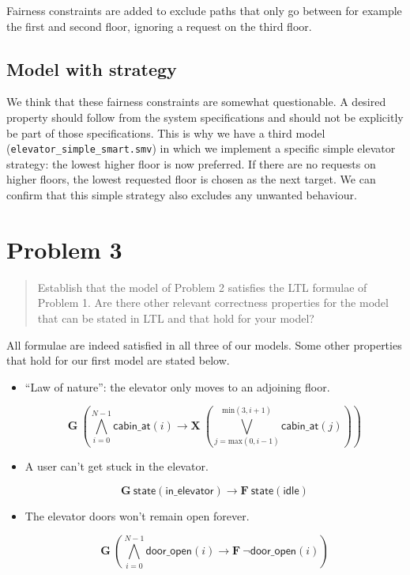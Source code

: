 \documentclass[a4paper,10pt]{article}
\newcommand{\LTLG}{\mathbf{G~}}
\newcommand{\LTLF}{\mathbf{F~}}
\newcommand{\LTLX}{\mathbf{X~}}
\newcommand{\disjall}[2]{\mathop{\bigvee}\limits_{#1}^{#2}}
\newcommand{\conjall}[2]{\mathop{\bigwedge}\limits_{#1}^{#2}}
\newcommand{\dooropen}[1]{\mathsf{door\_open}(#1)}
\newcommand{\cabinat}[1]{\mathsf{cabin\_at}(#1)}
\newcommand{\state}[1]{\mathsf{state}(\mathsf{#1})}
\newcommand{\imply}{\rightarrow}
\begin{document}
	Fairness constraints are added to exclude paths that only go between for example the first and second floor, ignoring a request on the third floor.
	
	\subsection{Model with strategy}
	We think that these fairness constraints are somewhat questionable. A desired property should follow from the system specifications and should not be explicitly be part of those specifications. This is why we have a third model (\texttt{elevator\_simple\_smart.smv}) in which we implement a specific simple elevator strategy: the lowest higher floor is now preferred. If there are no requests on higher floors, the lowest requested floor is chosen as the next target. We can confirm that this simple strategy also excludes any unwanted behaviour.
	
	\section{Problem 3}
	
	\begin{quote}
		Establish that the model of Problem 2 satisfies the LTL formulae of Problem 1. Are there other relevant correctness properties for the model that can be stated in LTL and that hold for your model?
	\end{quote}
	
	All formulae are indeed satisfied in all three of our models. Some other properties that hold for our first model are stated below.
	
	\begin{itemize}
		\item
			``Law of nature'': the elevator only moves to an adjoining floor.
			
			\[
				\LTLG \left( \conjall{i=0}{N-1} \cabinat{i} \imply \LTLX \left( \disjall{j=\textrm{max}(0, i-1)}{\textrm{min}(3, i+1)} \cabinat{j} \right) \right)
			\]
		
		\item
			A user can't get stuck in the elevator.
			
			\[
				\LTLG \state{in\_elevator} \imply \LTLF \state{idle}
			\]
		
		\item
			The elevator doors won't remain open forever.
			
			\[
				\LTLG \left( \conjall{i=0}{N-1} \dooropen{i} \imply \LTLF \neg \dooropen{i} \right)
			\]
	\end{itemize}
	
\end{document}
